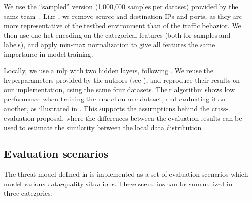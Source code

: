 We use the ``sampled'' version (1,000,000 samples per dataset) provided by the same team~\cite{layeghy_GeneralisabilityMachineLearningbased_2022}. 
Like \textcite{decarvalhobertoli_Generalizingintrusiondetection_2023}, we remove source and destination IPs and ports, as they are more representative of the testbed environment than of the traffic behavior.
We then use one-hot encoding on the categorical features (both for samples and labels), and apply min-max normalization to give all features the same importance in model training.

Locally, we use a \gls{mlp} with two hidden layers, following \textcite{popoola_FederatedDeepLearning_2021}.
We reuse the hyperparameters provided by the authors (see ), and reproduce their results on our implementation, using the same four datasets.
Their algorithm shows low performance when training the model on one dataset, and evaluating it on another, as illustrated in .
This supports the assumptions behind the cross-evaluation proposal, where the differences between the evaluation results can be used to estimate the similarity between the local data distribution.


\subsection{Evaluation scenarios\label{sec:radar.methodo.scenarios}}

The threat model defined in  is implemented as a set of evaluation scenarios which model various data-quality situations.
These scenarios can be summarized in three categories:



